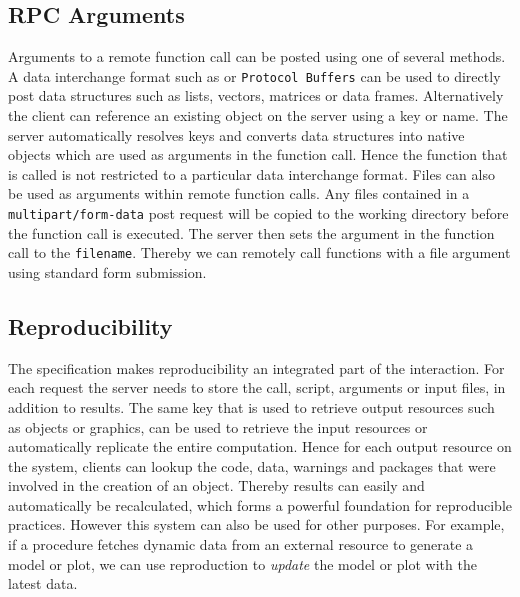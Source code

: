\subsection{RPC Arguments}

Arguments to a remote function call can be posted using one of several methods. A data interchange format such as \JSON or \texttt{Protocol Buffers} can be used to directly post data structures such as lists, vectors, matrices or data frames. Alternatively the client can reference an existing object on the server using a key or name. The server automatically resolves keys and converts data structures into native objects which are used as arguments in the function call. Hence the function that is called is not restricted to a particular data interchange format. Files can also be used as arguments within remote function calls. Any files contained in a \texttt{multipart/form-data}  post request will be copied to the working directory before the function call is executed. The server then sets the argument in the function call to the \texttt{filename}. Thereby we can remotely call functions with a file argument using standard \HTML form submission.


\subsection{Reproducibility}

The \OpenCPU specification makes reproducibility an integrated part of the \API interaction. For each \RPC request the server needs to store the call, script, arguments or input files, in addition to results. The same key that is used to retrieve output resources such as objects or graphics, can be used to retrieve the input resources or automatically replicate the entire computation. Hence for each output resource on the system, clients can lookup the code, data, warnings and packages that were involved in the creation of an object. Thereby results can easily and automatically be recalculated, which forms a powerful foundation for reproducible practices. However this system can also be used for other purposes. For example, if a procedure fetches dynamic data from an external resource to generate a model or plot, we can use reproduction to \emph{update} the model or plot with the latest data.


